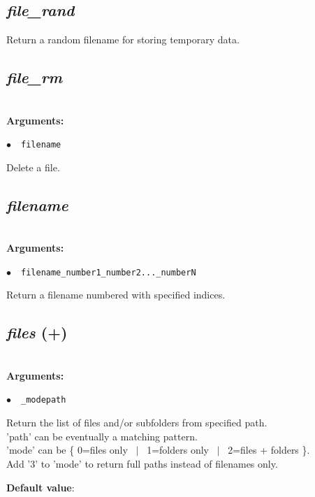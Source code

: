 \documentclass[a4paper,10.5pt,twoside]{book}
\def\comma{\discretionary{,}{}{,}}
\newcommand{\Cb}[1]{\textcolor{cb}{#1}}
\newcommand{\Cc}[1]{\textcolor{cc}{#1}}
\begin{document}
\subsection{\emph{file\_rand} }\vspace*{-0.7em}
Return a random filename for storing temporary data.


\subsection{\emph{file\_rm} }\vspace*{-0.7em}
~\\\textbf{\Cb{Arguments: }}\begin{flushleft}
{\small \Cb{\hspace*{0.5cm}$\bullet$~~\texttt{filename}}}\end{flushleft}
Delete a file.


\subsection{\emph{filename} }\vspace*{-0.7em}
~\\\textbf{\Cb{Arguments: }}\begin{flushleft}
{\small \Cb{\hspace*{0.5cm}$\bullet$~~\texttt{filename{\comma}\_number1{\comma}\_number2{\comma}...{\comma}\_numberN}}}\end{flushleft}
Return a filename numbered with specified indices.


\subsection{\emph{files} (+)}\vspace*{-0.7em}
~\\\textbf{\Cb{Arguments: }}\begin{flushleft}
{\small \Cb{\hspace*{0.5cm}$\bullet$~~\texttt{\_mode{\comma}path}}}\end{flushleft}
Return the list of files and/or subfolders from specified path.
~\\'path' can be eventually a matching pattern.
~\\'mode' can be \{ 0=files only ~$|$~ 1=folders only ~$|$~ 2=files + folders \}.
~\\Add '3' to 'mode' to return full paths instead of filenames only.
\begin{flushleft}\Cc{\textbf{Default value}:\\~\\\hspace*{0.5cm}{\small $\bullet$~~\texttt{'mode=5'.}}}\end{flushleft}
\end{document}
